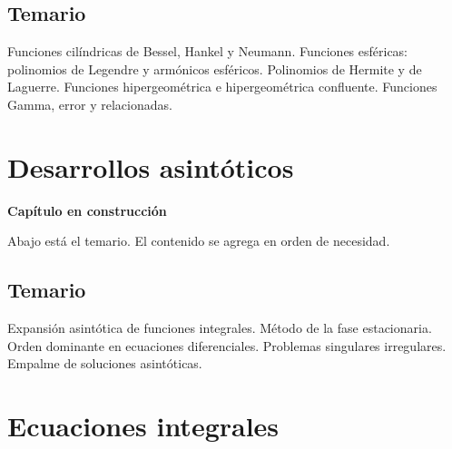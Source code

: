\documentclass[
  spanish,
  a4paper,
]{scrbook}
\theoremstyle{definition}
\theoremstyle{plain}
\theoremstyle{definition}
\theoremstyle{plain}
\theoremstyle{definition}
\theoremstyle{remark}
\begin{document}
\section*{Temario}\label{temario-9}


Funciones cilíndricas de Bessel, Hankel y Neumann. Funciones esféricas:
polinomios de Legendre y armónicos esféricos. Polinomios de Hermite y de
Laguerre. Funciones hipergeométrica e hipergeométrica confluente.
Funciones Gamma, error y relacionadas.

\chapter{Desarrollos asintóticos}\label{sec-asintoticos}

\begin{tcolorbox}[enhanced jigsaw, arc=.35mm, bottomrule=.15mm, breakable, colback=white, colframe=quarto-callout-note-color-frame, left=2mm, leftrule=.75mm, opacityback=0, rightrule=.15mm, toprule=.15mm]
\begin{minipage}[t]{5.5mm}
\textcolor{quarto-callout-note-color}{\faInfo}
\end{minipage}%
\begin{minipage}[t]{\textwidth - 5.5mm}

\vspace{-3mm}\textbf{Capítulo en construcción}\vspace{3mm}

Abajo está el temario. El contenido se agrega en orden de necesidad.

\end{minipage}%
\end{tcolorbox}

\section*{Temario}\label{temario-10}


Expansión asintótica de funciones integrales. Método de la fase
estacionaria. Orden dominante en ecuaciones diferenciales. Problemas
singulares irregulares. Empalme de soluciones asintóticas.

\chapter{Ecuaciones integrales}\label{sec-integrales}
\end{document}
